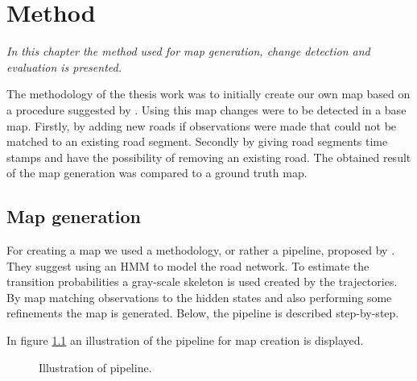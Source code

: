 \chapter{Method}
\label{chp:method}

{\it In this chapter the method used for map generation, change detection and evaluation is presented.}

The methodology of the thesis work was to initially create our own map based on a procedure suggested by \cite{biagioni:gis12}. Using this map changes were to be detected in a base map. Firstly, by adding new roads if observations were made that could not be matched to an existing road segment. Secondly by giving road segments time stamps and have the possibility of removing an existing road. The obtained result of the map generation was compared to a ground truth map.

\section{Map generation}
\label{chp:method.sec:map}

For creating a map we used a methodology, or rather a pipeline, proposed by \cite{biagioni:gis12}. They suggest using an \ac{HMM} to model the road network. To estimate the transition probabilities a gray-scale skeleton is used created by the trajectories. By map matching observations to the hidden states and also performing some refinements the map is generated. Below, the pipeline is described step-by-step. 

In figure \ref{fig:pipeline} an illustration of the pipeline for map creation is displayed.

\begin{figure}[H]
    \centering
    \caption{Illustration of pipeline.}
    \label{fig:pipeline}
\end{figure}

